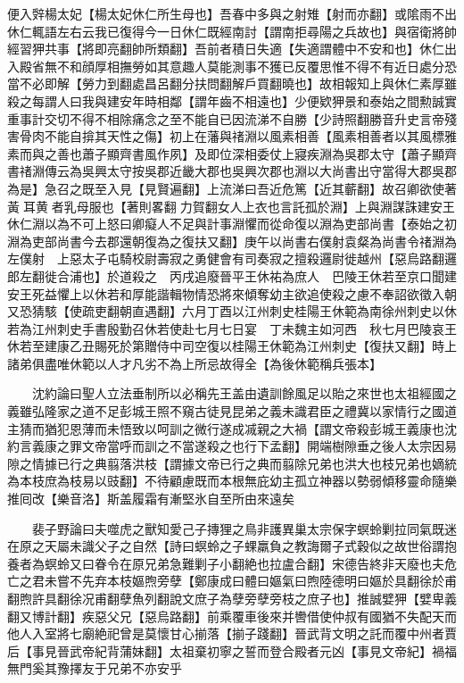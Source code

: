 便入辤楊太妃【楊太妃休仁所生母也】吾春中多與之射雉【射而亦翻】或隂雨不出休仁輒語左右云我已復得今一日休仁既經南討【謂南拒尋陽之兵故也】與宿衛將帥經習狎共事【將即亮翻帥所類翻】吾前者積日失適【失適謂體中不安和也】休仁出入殿省無不和顔厚相撫勞如其意趣人莫能測事不獲已反覆思惟不得不有近日處分恐當不必即解【勞力到翻處昌呂翻分扶問翻解戶買翻曉也】故相報知上與休仁素厚雖殺之每謂人曰我與建安年時相鄰【謂年齒不相遠也】少便欵狎景和泰始之間勲誠實重事計交切不得不相除痛念之至不能自已因流涕不自勝【少詩照翻勝音升史言帝殘害骨肉不能自揜其天性之傷】初上在藩與禇淵以風素相善【風素相善者以其風標雅素而與之善也蕭子顯齊書風作夙】及即位深相委仗上寢疾淵為吳郡太守【蕭子顯齊書禇淵傳云為吳興太守按吳郡近畿大郡也吳興次郡也淵以大尚書出守當得大郡吳郡為是】急召之既至入見【見賢遍翻】上流涕曰吾近危篤【近其蘄翻】故召卿欲使著黃耳黄者乳母服也【著則畧翻力賀翻女人上衣也言託孤於淵】上與淵謀誅建安王休仁淵以為不可上怒曰卿癡人不足與計事淵懼而從命復以淵為吏部尚書【泰始之初淵為吏部尚書今去郡還朝復為之復扶又翻】庚午以尚書右僕射袁粲為尚書令禇淵為左僕射　上惡太子屯騎校尉壽寂之勇健會有司奏寂之擅殺邏尉徙越州【惡烏路翻邏郎左翻徙合浦也】於道殺之　丙戌追廢晉平王休祐為庶人　巴陵王休若至京口聞建安王死益懼上以休若和厚能諧輯物情恐將來傾奪幼主欲追使殺之慮不奉詔欲徵入朝又恐猜駭【使疏吏翻朝直遇翻】六月丁酉以江州刺史桂陽王休範為南徐州刺史以休若為江州刺史手書殷勤召休若使赴七月七日宴　丁未魏主如河西　秋七月巴陵哀王休若至建康乙丑賜死於第贈侍中司空復以桂陽王休範為江州刺史【復扶又翻】時上諸弟俱盡唯休範以人才凡劣不為上所忌故得全【為後休範稱兵張本】

　　沈約論曰聖人立法垂制所以必稱先王盖由遺訓餘風足以貽之來世也太祖經國之義雖弘隆家之道不足彭城王照不窺古徒見昆弟之義未識君臣之禮冀以家情行之國道主猜而猶犯恩薄而未悟致以呵訓之微行遂成㓕親之大禍【謂文帝殺彭城王義康也沈約言義康之罪文帝當呼而訓之不當遂殺之也行下孟翻】開端樹隙垂之後人太宗因易隙之情據已行之典翦落洪枝【謂據文帝已行之典而翦除兄弟也洪大也枝兄弟也嫡統為本枝庶為枝易以豉翻】不待顧慮既而本根無庇幼主孤立神器以勢弱傾移靈命隨樂推囘改【樂音洛】斯盖履霜有漸堅氷自至所由來遠矣

　　裴子野論曰夫噬虎之獸知愛己子摶狸之鳥非護異巢太宗保字螟蛉剿拉同氣既迷在原之天屬未識父子之自然【詩曰螟蛉之子蜾羸負之教誨爾子式穀似之故世俗謂抱養者為螟蛉又曰眷令在原兄弟急難剿子小翻絶也拉盧合翻】宋德告終非天廢也夫危亡之君未嘗不先弃本枝嫗煦旁孽【鄭康成曰體曰嫗氣曰煦陸德明曰嫗於具翻徐於甫翻煦許具翻徐况甫翻孽魚列翻說文庶子為孽旁孽旁枝之庶子也】推誠嬖狎【嬖卑義翻又博計翻】疾惡父兄【惡烏路翻】前乘覆車後來并轡借使仲叔有國猶不失配天而他人入室將七廟絶祀曾是莫懷甘心揃落【揃子踐翻】晉武背文明之託而覆中州者賈后【事見晉武帝紀背蒲妹翻】太祖棄初寧之誓而登合殿者元凶【事見文帝紀】禍福無門奚其豫擇友于兄弟不亦安乎

